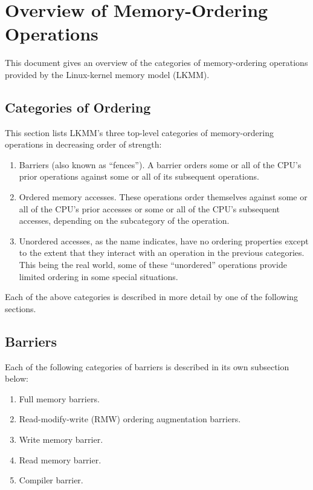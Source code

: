 \chapter{Overview of Memory-Ordering Operations}

This document gives an overview of the categories of memory-ordering
operations provided by the Linux-kernel memory model (LKMM).


\section{Categories of Ordering}

This section lists LKMM's three top-level categories of memory-ordering
operations in decreasing order of strength:

\begin{enumerate}
 \item	Barriers (also known as ``fences'').
	A barrier orders some or all of the CPU's prior operations
	against some or all of its subsequent operations.

 \item	Ordered memory accesses.
	These operations order themselves against some or all of
	the CPU's prior accesses or some or all	of the CPU's subsequent
	accesses, depending on the subcategory of the operation.

 \item	Unordered accesses, as the name indicates, have no ordering
	properties except to the extent that they interact with an
	operation in the previous categories.
	This being the real world, some of these ``unordered''
	operations provide limited ordering in some special situations.
\end{enumerate}

Each of the above categories is described in more detail by one of the
following sections.


\section{Barriers}

Each of the following categories of barriers is described in its own
subsection below:

\begin{enumerate}
 \item	Full memory barriers.

 \item	Read-modify-write (RMW) ordering augmentation barriers.

 \item	Write memory barrier.

 \item	Read memory barrier.

 \item	Compiler barrier.
\end{enumerate}

